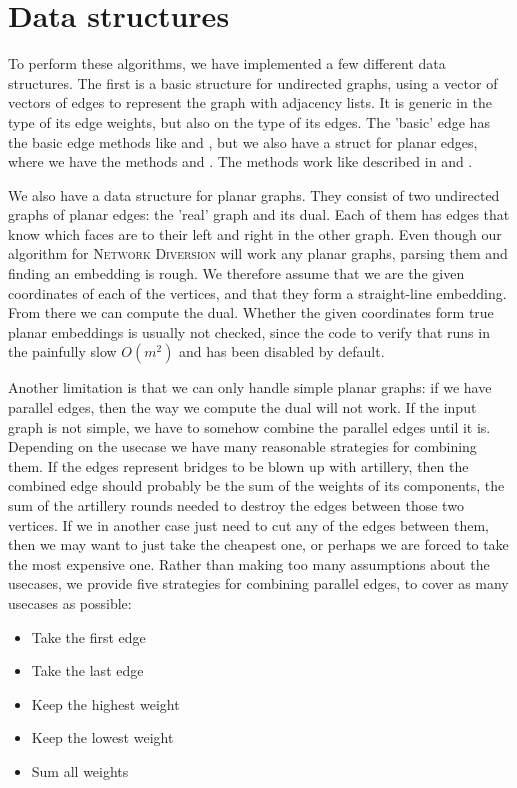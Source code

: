 \section{Data structures}
To perform these algorithms, we have implemented a few different data structures. The first is a basic structure for undirected graphs, using a vector of vectors of edges to represent the graph with adjacency lists. It is generic in the type of its edge weights, but also on the type of its edges. The 'basic' edge has the basic edge methods like  and , but we also have a struct for planar edges, where we have the methods  and . The methods work like described in  and . 

We also have a data structure for planar graphs. They consist of two undirected graphs of planar edges: the 'real' graph and its dual. Each of them has edges that know which faces are to their left and right in the other graph. Even though our algorithm for \textsc{Network Diversion} will work any planar graphs, parsing them and finding an embedding is rough. We therefore assume that we are the given coordinates of each of the vertices, and that they form a straight-line embedding. From there we can compute the dual. Whether the given coordinates form true planar embeddings is usually not checked, since the code to verify that runs in the painfully slow $O(m^2)$ and has been disabled by default.

Another limitation is that we can only handle simple planar graphs: if we have parallel edges, then the way we compute the dual will not work. If the input graph is not simple, we have to somehow combine the parallel edges until it is. Depending on the usecase we have many reasonable strategies for combining them. If the edges represent bridges to be blown up with artillery, then the combined edge should probably be the sum of the weights of its components, the sum of the artillery rounds needed to destroy the edges between those two vertices. If we in another case just need to cut any of the edges between them, then we may want to just take the cheapest one, or perhaps we are forced to take the most expensive one. Rather than making too many assumptions about the usecases, we provide five strategies for combining parallel edges, to cover as many usecases as possible: 

\begin{itemize}
    \item Take the first edge
    \item Take the last edge
    \item Keep the highest weight
    \item Keep the lowest weight
    \item Sum all weights
\end{itemize}

